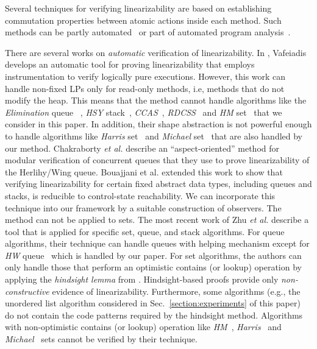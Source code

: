Several techniques for verifying linearizability are based on establishing
commutation properties between atomic actions inside each method.
Such methods can be partly automated~\cite{EQSST:tacas10,singh:issre16}
or part of automated program analysis~\cite{LMP:cav14}.

There are several works on {\it automatic} verification of linearizability.
%
In \cite{Vafeiadis:cav10}, Vafeiadis
develops an automatic tool for proving  linearizability that
employs instrumentation to verify logically pure executions.
%
However, this work can handle non-fixed LPs only for read-only methods,
i.e, methods that do not modify the heap.
%
This means that the method cannot handle
 algorithms like the {\it Elimination} queue ~\cite{Shavit:ElimQueue}, {\it HSY} stack~\cite{HSYstack}, {\it CCAS}~\cite{Harris:CAS}, 
{\it RDCSS}~\cite{Harris:CAS} and {\it HM} set~\cite{ArtOfMpP} that we consider in this paper. In addition, their shape abstraction is not powerful enough to handle algorithms like {\it Harris} set~\cite{Harris:list} and {\it Michael} set~\cite{Michael:list} that are also handled by our method.
%
%
Chakraborty {\it et al.} \cite{HSV:concur13}
describe an ``aspect-oriented'' method for  modular verification 
of concurrent queues that they use to prove linearizability of the Herlihy/Wing queue.
Bouajjani et al. \cite{BEEH:icalp15} extended this work to show that verifying 
linearizability for certain
fixed abstract data types, including queues and stacks, is reducible to 
control-state reachability. 
%
We can incorporate this technique into
our framework by a suitable construction of observers.
The method can not be applied to sets.
%
The most recent work of Zhu {\it et al.} \cite{Poling}
describe a tool that is applied for specific set, queue, and stack  
algorithms. For queue algorithms, their technique can handle queues with helping mechanism except for {\it HW} queue~\cite{HeWi:linearizability} which is handled by our paper.
%
For set algorithms, the authors can only handle those that perform an optimistic contains (or lookup) operation by applying the {\it hindsight lemma} from 
\cite{OHearnlist}. 
%
Hindsight-based proofs provide only {\it non-constructive} 
evidence of linearizability.
%
Furthermore, some algorithms (e.g., the unordered list algorithm
considered in Sec.~\ref{section:experiments} of this paper)
do not contain the code patterns required by the hindsight method. Algorithms with non-optimistic contains (or lookup) operation like {\it HM}~\cite{ArtOfMpP}, {\it Harris}~\cite{Harris:list} and {\it Michael}~\cite{Michael:list} sets cannot be verified by their technique.  
